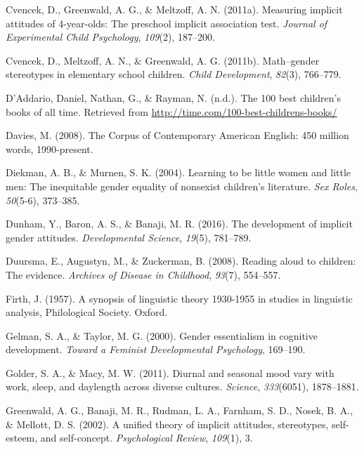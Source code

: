 \documentclass[english,,man,floatsintext]{apa6}
\begin{document}
\leavevmode\hypertarget{ref-cvencek2011measuring}{}%
Cvencek, D., Greenwald, A. G., \& Meltzoff, A. N. (2011a). Measuring implicit attitudes of 4-year-olds: The preschool implicit association test. \emph{Journal of Experimental Child Psychology}, \emph{109}(2), 187--200.

\leavevmode\hypertarget{ref-cvencek2011math}{}%
Cvencek, D., Meltzoff, A. N., \& Greenwald, A. G. (2011b). Math--gender stereotypes in elementary school children. \emph{Child Development}, \emph{82}(3), 766--779.

\leavevmode\hypertarget{ref-time_100_kidbooks}{}%
D'Addario, Daniel, Nathan, G., \& Rayman, N. (n.d.). The 100 best children's books of all time. Retrieved from \url{http://time.com/100-best-childrens-books/}

\leavevmode\hypertarget{ref-davies2008corpus}{}%
Davies, M. (2008). The Corpus of Contemporary American English: 450 million words, 1990-present.

\leavevmode\hypertarget{ref-diekman2004learning}{}%
Diekman, A. B., \& Murnen, S. K. (2004). Learning to be little women and little men: The inequitable gender equality of nonsexist children's literature. \emph{Sex Roles}, \emph{50}(5-6), 373--385.

\leavevmode\hypertarget{ref-dunham2016development}{}%
Dunham, Y., Baron, A. S., \& Banaji, M. R. (2016). The development of implicit gender attitudes. \emph{Developmental Science}, \emph{19}(5), 781--789.

\leavevmode\hypertarget{ref-duursma2008reading}{}%
Duursma, E., Augustyn, M., \& Zuckerman, B. (2008). Reading aloud to children: The evidence. \emph{Archives of Disease in Childhood}, \emph{93}(7), 554--557.

\leavevmode\hypertarget{ref-firth1957synopsis}{}%
Firth, J. (1957). A synopsis of linguistic theory 1930-1955 in studies in linguistic analysis, Philological Society. Oxford.

\leavevmode\hypertarget{ref-gelman2000gender}{}%
Gelman, S. A., \& Taylor, M. G. (2000). Gender essentialism in cognitive development. \emph{Toward a Feminist Developmental Psychology}, 169--190.

\leavevmode\hypertarget{ref-golder2011diurnal}{}%
Golder, S. A., \& Macy, M. W. (2011). Diurnal and seasonal mood vary with work, sleep, and daylength across diverse cultures. \emph{Science}, \emph{333}(6051), 1878--1881.

\leavevmode\hypertarget{ref-greenwald2002unified}{}%
Greenwald, A. G., Banaji, M. R., Rudman, L. A., Farnham, S. D., Nosek, B. A., \& Mellott, D. S. (2002). A unified theory of implicit attitudes, stereotypes, self-esteem, and self-concept. \emph{Psychological Review}, \emph{109}(1), 3.
\end{document}
